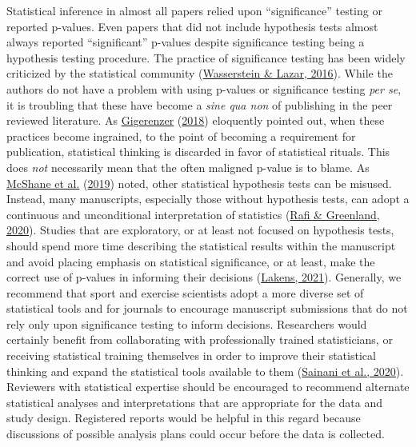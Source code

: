 \documentclass[]{cik}%
\begin{document}
Statistical inference in almost all papers relied upon ``significance''
testing or reported p-values. Even papers that did not include
hypothesis tests almost always reported ``significant'' p-values despite
significance testing being a hypothesis testing procedure. The practice
of significance testing has been widely criticized by the statistical
community (\protect\hyperlink{ref-wasserstein2016asa}{Wasserstein \&
Lazar, 2016}). While the authors do not have a problem with using
p-values or significance testing \emph{per se}, it is troubling that
these have become a \emph{sine qua non} of publishing in the peer
reviewed literature. As
\protect\hyperlink{ref-gigerenzer2018}{Gigerenzer}
(\protect\hyperlink{ref-gigerenzer2018}{2018}) eloquently pointed out,
when these practices become ingrained, to the point of becoming a
requirement for publication, statistical thinking is discarded in favor
of statistical rituals. This does \emph{not} necessarily mean that the
often maligned p-value is to blame. As
\protect\hyperlink{ref-mcshane2019abandon}{McShane et al.}
(\protect\hyperlink{ref-mcshane2019abandon}{2019}) noted, other
statistical hypothesis tests can be misused. Instead, many manuscripts,
especially those without hypothesis tests, can adopt a continuous and
unconditional interpretation of statistics
(\protect\hyperlink{ref-rafi2020semantic}{Rafi \& Greenland, 2020}).
Studies that are exploratory, or at least not focused on hypothesis
tests, should spend more time describing the statistical results within
the manuscript and avoid placing emphasis on statistical significance,
or at least, make the correct use of p-values in informing their
decisions (\protect\hyperlink{ref-Lakens2021pvalue}{Lakens, 2021}).
Generally, we recommend that sport and exercise scientists adopt a more
diverse set of statistical tools and for journals to encourage
manuscript submissions that do not rely only upon significance testing
to inform decisions. Researchers would certainly benefit from
collaborating with professionally trained statisticians, or receiving
statistical training themselves in order to improve their statistical
thinking and expand the statistical tools available to them
(\protect\hyperlink{ref-sainani2020}{Sainani et al., 2020}). Reviewers
with statistical expertise should be encouraged to recommend alternate
statistical analyses and interpretations that are appropriate for the
data and study design. Registered reports would be helpful in this
regard because discussions of possible analysis plans could occur before
the data is collected.
\end{document}
